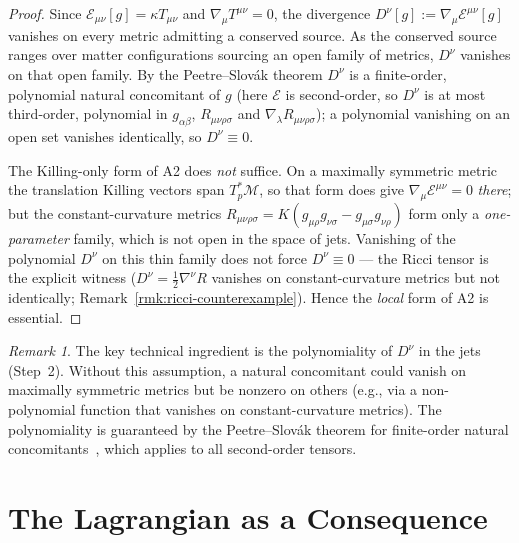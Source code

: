 \documentclass[12pt]{article}
\theoremstyle{plain}
\theoremstyle{definition}
\theoremstyle{remark}
\newtheorem{remark}[theorem]{Remark}
\begin{document}
\begin{proof}
Since $\mathcal{E}_{\mu\nu}[g] = \kappa T_{\mu\nu}$ and $\nabla_\mu T^{\mu\nu} = 0$, the divergence $D^\nu[g] := \nabla_\mu\mathcal{E}^{\mu\nu}[g]$ vanishes on every metric admitting a conserved source. As the conserved source ranges over matter configurations sourcing an open family of metrics, $D^\nu$ vanishes on that open family. By the Peetre--Slov\'ak theorem $D^\nu$ is a finite-order, polynomial natural concomitant of $g$ (here $\mathcal{E}$ is second-order, so $D^\nu$ is at most third-order, polynomial in $g_{\alpha\beta}$, $R_{\mu\nu\rho\sigma}$ and $\nabla_\lambda R_{\mu\nu\rho\sigma}$); a polynomial vanishing on an open set vanishes identically, so $D^\nu \equiv 0$.

The Killing-only form of A2 does \emph{not} suffice. On a maximally symmetric metric the translation Killing vectors span $T_p^*\mathcal{M}$, so that form does give $\nabla_\mu\mathcal{E}^{\mu\nu} = 0$ \emph{there}; but the constant-curvature metrics $R_{\mu\nu\rho\sigma} = K(g_{\mu\rho}g_{\nu\sigma} - g_{\mu\sigma}g_{\nu\rho})$ form only a \emph{one-parameter} family, which is not open in the space of jets. Vanishing of the polynomial $D^\nu$ on this thin family does not force $D^\nu \equiv 0$ --- the Ricci tensor is the explicit witness ($D^\nu = \tfrac12\nabla^\nu R$ vanishes on constant-curvature metrics but not identically; Remark~\ref{rmk:ricci-counterexample}). Hence the \emph{local} form of A2 is essential.
\end{proof}

\begin{remark}
The key technical ingredient is the polynomiality of $D^\nu$ in the jets (Step~2). Without this assumption, a natural concomitant could vanish on maximally symmetric metrics but be nonzero on others (e.g., via a non-polynomial function that vanishes on constant-curvature metrics). The polynomiality is guaranteed by the Peetre--Slov\'ak theorem for finite-order natural concomitants~\cite{kolarslovak1993}, which applies to all second-order tensors.
\end{remark}


\section{The Lagrangian as a Consequence}
\label{sec:lagrangian}
\end{document}
